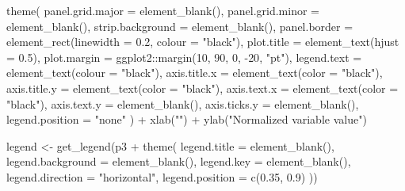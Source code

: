 \documentclass[
  11pt,
  oneside]{book}
\newenvironment{Shaded}{\begin{snugshade}}{\end{snugshade}}
\newcommand{\AttributeTok}[1]{\textcolor[rgb]{0.77,0.63,0.00}{#1}}
\newcommand{\DecValTok}[1]{\textcolor[rgb]{0.00,0.00,0.81}{#1}}
\newcommand{\FloatTok}[1]{\textcolor[rgb]{0.00,0.00,0.81}{#1}}
\newcommand{\FunctionTok}[1]{\textcolor[rgb]{0.00,0.00,0.00}{#1}}
\newcommand{\NormalTok}[1]{#1}
\newcommand{\OtherTok}[1]{\textcolor[rgb]{0.56,0.35,0.01}{#1}}
\newcommand{\SpecialCharTok}[1]{\textcolor[rgb]{0.00,0.00,0.00}{#1}}
\newcommand{\StringTok}[1]{\textcolor[rgb]{0.31,0.60,0.02}{#1}}
\begin{document}
\begin{Shaded}
\begin{Highlighting}[]
  \FunctionTok{theme}\NormalTok{(}
    \AttributeTok{panel.grid.major =} \FunctionTok{element\_blank}\NormalTok{(),}
    \AttributeTok{panel.grid.minor =} \FunctionTok{element\_blank}\NormalTok{(),}
    \AttributeTok{strip.background =} \FunctionTok{element\_blank}\NormalTok{(),}
    \AttributeTok{panel.border =} \FunctionTok{element\_rect}\NormalTok{(}\AttributeTok{linewidth =} \FloatTok{0.2}\NormalTok{, }\AttributeTok{colour =} \StringTok{"black"}\NormalTok{),}
    \AttributeTok{plot.title =} \FunctionTok{element\_text}\NormalTok{(}\AttributeTok{hjust =} \FloatTok{0.5}\NormalTok{),}
    \AttributeTok{plot.margin =}\NormalTok{ ggplot2}\SpecialCharTok{::}\FunctionTok{margin}\NormalTok{(}\DecValTok{10}\NormalTok{, }\DecValTok{90}\NormalTok{, }\DecValTok{0}\NormalTok{, }\SpecialCharTok{{-}}\DecValTok{20}\NormalTok{, }\StringTok{"pt"}\NormalTok{),}
    \AttributeTok{legend.text =} \FunctionTok{element\_text}\NormalTok{(}\AttributeTok{colour =} \StringTok{"black"}\NormalTok{),}
    \AttributeTok{axis.title.x =} \FunctionTok{element\_text}\NormalTok{(}\AttributeTok{color =} \StringTok{"black"}\NormalTok{),}
    \AttributeTok{axis.title.y =} \FunctionTok{element\_text}\NormalTok{(}\AttributeTok{color =} \StringTok{"black"}\NormalTok{),}
    \AttributeTok{axis.text.x =} \FunctionTok{element\_text}\NormalTok{(}\AttributeTok{color =} \StringTok{"black"}\NormalTok{),}
    \AttributeTok{axis.text.y =} \FunctionTok{element\_blank}\NormalTok{(),}
    \AttributeTok{axis.ticks.y =} \FunctionTok{element\_blank}\NormalTok{(),}
    \AttributeTok{legend.position =} \StringTok{"none"}
\NormalTok{  ) }\SpecialCharTok{+}
  \FunctionTok{xlab}\NormalTok{(}\StringTok{""}\NormalTok{) }\SpecialCharTok{+}
  \FunctionTok{ylab}\NormalTok{(}\StringTok{"Normalized variable value"}\NormalTok{)}

\NormalTok{legend }\OtherTok{\textless{}{-}} \FunctionTok{get\_legend}\NormalTok{(p3 }\SpecialCharTok{+}
  \FunctionTok{theme}\NormalTok{(}
    \AttributeTok{legend.title =} \FunctionTok{element\_blank}\NormalTok{(),}
    \AttributeTok{legend.background =} \FunctionTok{element\_blank}\NormalTok{(),}
    \AttributeTok{legend.key =} \FunctionTok{element\_blank}\NormalTok{(),}
    \AttributeTok{legend.direction =} \StringTok{"horizontal"}\NormalTok{,}
    \AttributeTok{legend.position =} \FunctionTok{c}\NormalTok{(}\FloatTok{0.35}\NormalTok{, }\FloatTok{0.9}\NormalTok{)}
\NormalTok{  ))}
\end{Highlighting}
\end{Shaded}
\end{document}
